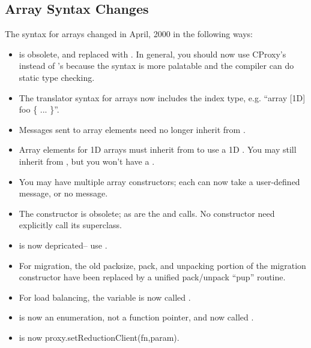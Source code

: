 \subsection{Array Syntax Changes}

The syntax for arrays changed in April, 2000 in the following ways:

\begin{itemize}

\item {} is obsolete, and replaced with .  In general,
you should now use CProxy's instead of 's because the syntax
is more palatable and the compiler can do static type checking.

\item The translator syntax for arrays now includes the index type,
e.g. ``array [1D] foo \{ ... \}''.

\item Messages sent to array elements need no longer inherit from 
.

\item Array elements for 1D arrays must inherit from  to use
a 1D .  You may still inherit from , but you
won't have a .

\item You may have multiple array constructors; each can now take a
user-defined message, or no message.  

\item The  constructor is obsolete;
as are the  and  calls. No
constructor need explicitly call its superclass.

\item {} is now depricated-- use 
.

\item For migration, the old packsize, pack, and unpacking portion of
the migration constructor have been replaced by a unified pack/unpack 
``pup'' routine.

\item For load balancing, the  variable is now called
.

\item {} is now an enumeration, not a function pointer,
and now called .

\item {} is now
proxy.setReductionClient(fn,param). 

\end{itemize}



